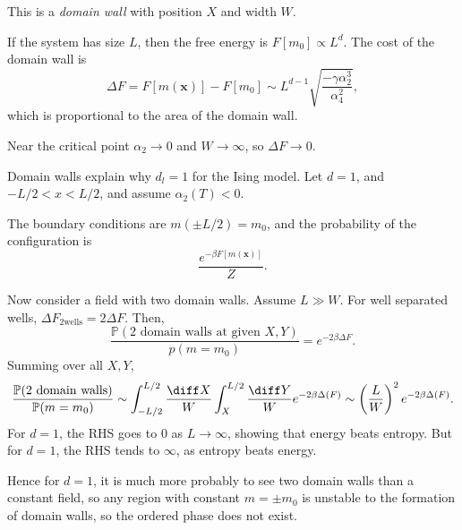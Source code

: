 \documentclass[12pt]{article}
\begin{document}
This is a \emph{domain wall} with position $X$ and width $W$.

If the system has size $L$, then the free energy is $F[m_0] \propto L^d$. The cost of the domain wall is
\[
	\Delta F = F[m(\mathbf{x})] - F[m_0] \sim L^{d-1} \sqrt{\frac{- \gamma \alpha_2^3}{\alpha_4^2}},
\]
which is proportional to the area of the domain wall.

Near the critical point $\alpha_2 \to 0$ and $W \to \infty$, so $\Delta F \to 0$.

Domain walls explain why $d_l = 1$ for the Ising model. Let $d= 1$, and $-L/2 < x < L/2$, and assume $\alpha_2(T) < 0$.

The boundary conditions are $m(\pm L/2) = m_0$, and the probability of the configuration is
\[
	\frac{e^{-\beta F[m(\mathbf{x})]}}{Z}.
\]

\begin{center}
\end{center}

Now consider a field with two domain walls. Assume $L \gg W$. For well separated wells, $\Delta F_{\mathrm{2 wells}} = 2 \Delta F$. Then,
\[
	\frac{\mathbb{P}(2 \text{ domain walls at given } X, Y)}{p(m = m_0)} = e^{-2 \beta \Delta F}.
\]
Summing over all $X, Y$,
\[
	\frac{\mathbb{P}(\text{2 domain walls})}{\mathbb{P}(m = m_0)} \sim \int_{-L/2}^{L/2} \frac{\diff X}{W} \int_{X}^{L/2} \frac{\diff Y}{W} e^{-2 \beta \Delta(F)} \sim \left( \frac{L}{W} \right)^2 e^{-2 \beta \Delta(F)}.
\]
For $d = 1$, the RHS goes to $0$ as $L \to \infty$, showing that energy beats entropy. But for $d = 1$, the RHS tends to $\infty$, as entropy beats energy.

Hence for $d = 1$, it is much more probably to see two domain walls than a constant field, so any region with constant $m = \pm m_0$ is unstable to the formation of domain walls, so the ordered phase does not exist.
\end{document}
